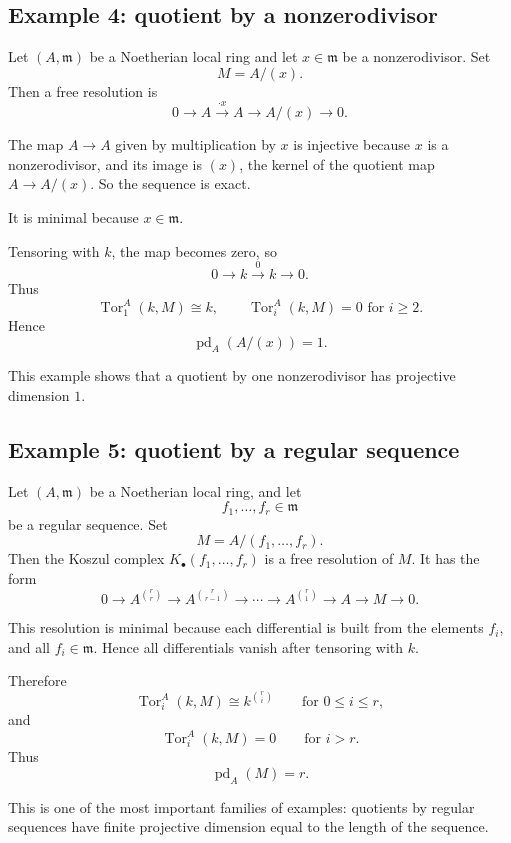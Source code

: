 \documentclass[12pt,a4paper]{article}
\theoremstyle{notespace}
\DeclareMathOperator{\Tor}{Tor}
\begin{document}
\subsection{Example 4: quotient by a nonzerodivisor}

Let \((A,\mathfrak m)\) be a Noetherian local ring and let \(x\in \mathfrak m\) be a nonzerodivisor. Set
\[
M=A/(x).
\]
Then a free resolution is
\[
0 \longrightarrow A \xrightarrow{\cdot x} A \longrightarrow A/(x) \longrightarrow 0.
\]

The map \(A\to A\) given by multiplication by \(x\) is injective because \(x\) is a nonzerodivisor, and its image is \((x)\), the kernel of the quotient map \(A\to A/(x)\). So the sequence is exact.

It is minimal because \(x\in \mathfrak m\).

Tensoring with \(k\), the map becomes zero, so
\[
0 \longrightarrow k \xrightarrow{0} k \longrightarrow 0.
\]
Thus
\[
\Tor_1^A(k,M)\cong k,
\qquad
\Tor_i^A(k,M)=0 \text{ for } i\ge 2.
\]
Hence
\[
\operatorname{pd}_A(A/(x))=1.
\]

This example shows that a quotient by one nonzerodivisor has projective dimension \(1\).

\subsection{Example 5: quotient by a regular sequence}

Let \((A,\mathfrak m)\) be a Noetherian local ring, and let
\[
f_1,\dots,f_r \in \mathfrak m
\]
be a regular sequence. Set
\[
M=A/(f_1,\dots,f_r).
\]
Then the Koszul complex \(K_\bullet(f_1,\dots,f_r)\) is a free resolution of \(M\). It has the form
\[
0
\longrightarrow
A^{\binom{r}{r}}
\longrightarrow
A^{\binom{r}{r-1}}
\longrightarrow
\cdots
\longrightarrow
A^{\binom{r}{1}}
\longrightarrow
A
\longrightarrow
M
\longrightarrow
0.
\]

This resolution is minimal because each differential is built from the elements \(f_i\), and all \(f_i\in \mathfrak m\). Hence all differentials vanish after tensoring with \(k\).

Therefore
\[
\Tor_i^A(k,M)\cong k^{\binom{r}{i}}
\qquad \text{for } 0\le i\le r,
\]
and
\[
\Tor_i^A(k,M)=0
\qquad \text{for } i>r.
\]
Thus
\[
\operatorname{pd}_A(M)=r.
\]

This is one of the most important families of examples: quotients by regular sequences have finite projective dimension equal to the length of the sequence.
\end{document}
